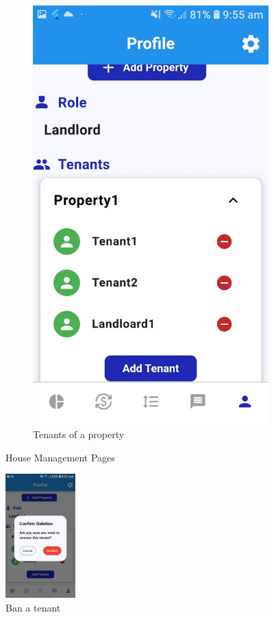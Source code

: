 \documentclass[sigconf]{acmart}
\begin{document}
\begin{figure}[h]
\begin{subfigure}{0.24\textwidth}
    \includegraphics[width=\textwidth]{propertyTenants.jpg}
    \caption{Tenants of a property}
    \label{fig:propertyTenants}
  \end{subfigure}
  \caption{House Management Pages}
\end{figure}

\begin{figure}[h]
  \centering
  \includegraphics[width=0.24\textwidth]{banTenant.jpg}
  \caption{Ban a tenant}
  \label{fig:banTenant}
\end{figure}
\end{document}
